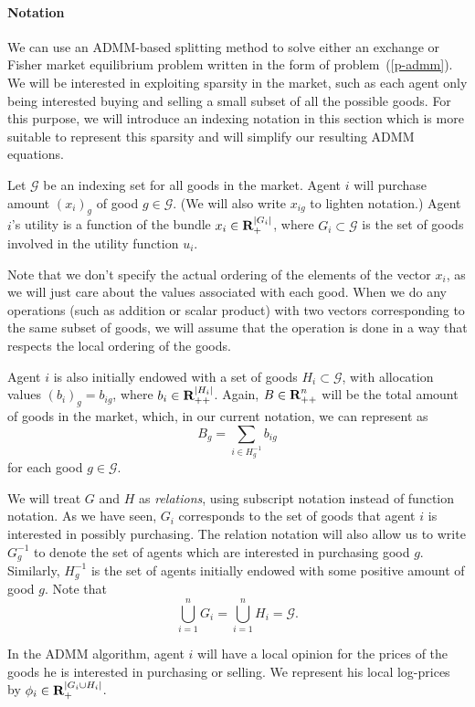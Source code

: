 \documentclass[12pt]{article}
\begin{document}
\paragraph{Notation}
We can use an ADMM-based splitting method \cite{boyd2011distributed} to
solve either an exchange or Fisher market equilibrium problem written in the form of
problem~(\ref{p-admm}).
We will be interested in exploiting sparsity in the market, such
as each agent only being interested buying and selling a small subset 
of all the possible goods.
For this purpose, we will introduce an indexing notation in this section which is
more suitable to represent this sparsity and will simplify our resulting
ADMM equations.

Let $\mathcal{G}$ be an indexing set for all goods
in the market.
Agent $i$ will purchase amount $(x_i)_g$ of good $g \in \mathcal{G}$.
(We will also write $x_{ig}$ to lighten notation.)
Agent $i$'s utility is a function of the bundle $x_i \in {\mbox{\bf R}}_{+}^{|G_i|}$,
where $G_i \subset \mathcal{G}$ is the set of goods involved in the utility
function $u_i$.

Note that we don't specify the actual ordering of the elements
of the vector $x_i$, as we will just care about the values associated with
each good.
When we do any operations (such as addition or scalar product) with
two vectors corresponding to the same subset of goods, we will
assume that the operation is done in a way that respects the local ordering of
the goods.

Agent $i$ is also initially endowed with a set of goods
$H_i \subset \mathcal{G}$,
with allocation values $(b_i)_g = b_{ig}$, where $b_i \in {\mbox{\bf R}}_{++}^{|H_i|}$.
Again, $B \in {\mbox{\bf R}}^n_{++}$ will be the total amount of goods in the market, which, in our
current notation, we can represent as
\[
B_g = \sum\limits_{i \in H^{-1}_g} b_{ig}
\]
for each good $g \in \mathcal{G}$.

We will treat $G$ and $H$ as \emph{relations},
using subscript notation instead of function notation.
As we have seen, $G_i$ corresponds to the set of goods that agent $i$ is
interested
in possibly purchasing.
The relation notation will also allow us to
write $G^{-1}_g$ to denote the set of agents which are interested in
purchasing good $g$.
Similarly, $H^{-1}_g$ is the set of agents initially endowed with some
positive amount of good $g$.
Note that
\[
\bigcup_{i=1}^n G_i = \bigcup_{i=1}^n H_i = \mathcal{G}.
\]

In the ADMM algorithm, agent $i$ will have a local opinion for the prices
of the goods he is interested in purchasing or selling.
We represent his local log-prices
by $\phi_i \in {\mbox{\bf R}}_+^{|G_i \cup H_i|}$.
\end{document}
